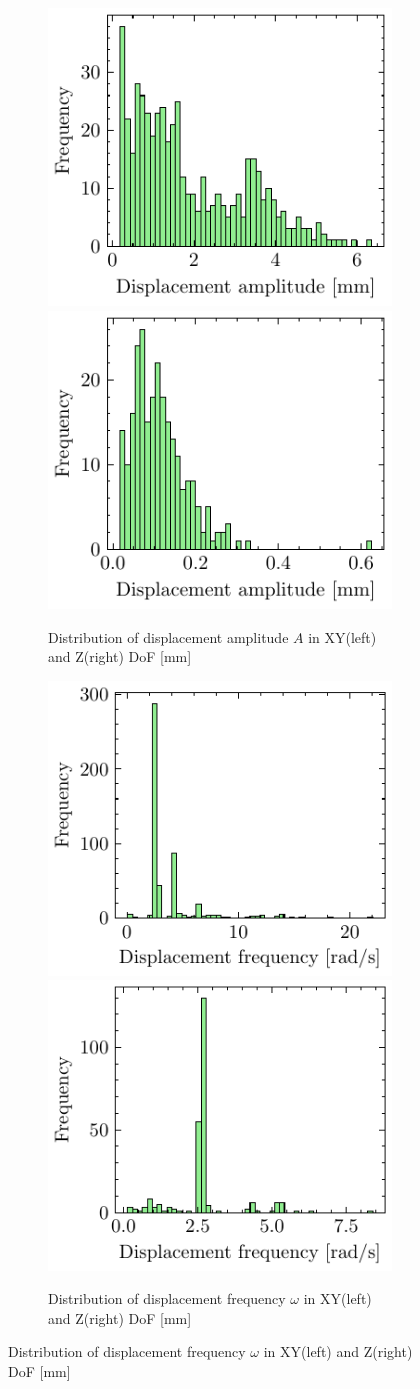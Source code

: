 \begin{figure}
    \begin{subfigure}{\linewidth}
    \includegraphics[width=.5\linewidth]{images/fig_chapter4/data_dist/1.pdf}\hfill
    \includegraphics[width=.5\linewidth]{images/fig_chapter4/data_dist/2.pdf}
    \caption{Distribution of displacement amplitude $ A $ in XY(left) and Z(right) DoF [mm]}
    \end{subfigure}\par\medskip
    
    \begin{subfigure}{\linewidth}
    \includegraphics[width=.5\linewidth]{images/fig_chapter4/data_dist/3.pdf}\hfill
    \includegraphics[width=.5\linewidth]{images/fig_chapter4/data_dist/4.pdf}
    \caption{Distribution of displacement frequency $ \omega $ in XY(left) and Z(right) DoF [mm]}
    \end{subfigure}\par\medskip
    

\end{figure}
